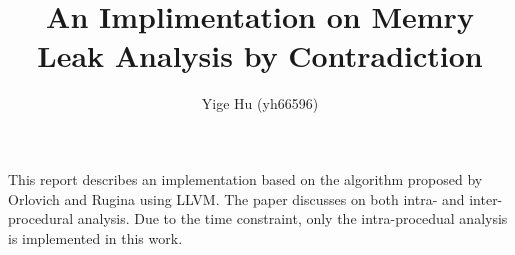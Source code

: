 \documentclass[12pt]{article}
\title{\bf \Large An Implimentation on Memry Leak Analysis by Contradiction}
\author{\normalsize Yige Hu (yh66596)}
\date{}
\newcommand{\llvm}[0]{LLVM\xspace}
\begin{document}
\maketitle


This report describes an implementation based on the algorithm proposed by
Orlovich and Rugina\cite{rugina} using \llvm. The paper discusses on both 
intra- and inter- procedural analysis. Due to the time constraint, only the
intra-procedual analysis is implemented in this work.

%

%



%

%


\footnotesize


\end{document}
